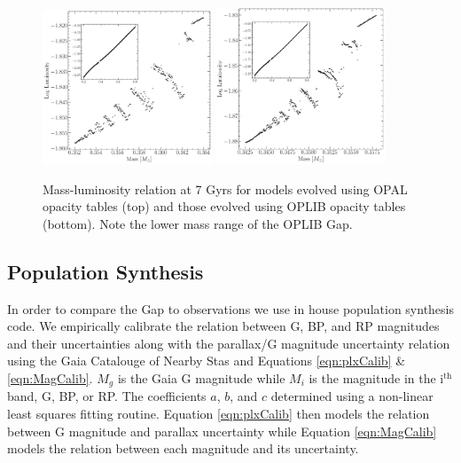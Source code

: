 \begin{figure}
	\centering
	\includegraphics[width=0.45\textwidth]{figures/jaoOpacity/OPALPunchIn.pdf}
	\includegraphics[width=0.45\textwidth]{figures/jaoOpacity/OPLIBPunchIn.pdf}
	\caption{Mass-luminosity relation at 7 Gyrs for models evolved using OPAL opacity
	tables (top) and those evolved using OPLIB opacity tables (bottom). Note
	the lower mass range of the OPLIB Gap.}
	\label{fig:PunchIn}
		
\end{figure}

\subsection{Population Synthesis}
In order to compare the Gap to observations we use in house population
synthesis code. We empirically calibrate the relation between G, BP, and RP
magnitudes and their uncertainties along with the parallax/G magnitude
uncertainty relation using the Gaia Catalouge of Nearby Stas
\citep[GCNS,][]{GaiaCollaboration2021} and Equations \ref{eqn:plxCalib} \&
\ref{eqn:MagCalib}. $M_{g}$ is the Gaia G magnitude while $M_{i}$ is the
magnitude in the i$^\text{th}$ band, G, BP, or RP. The coefficients $a$, $b$,
and $c$ determined using a non-linear least squares fitting routine. Equation
\ref{eqn:plxCalib} then models the relation between G magnitude and parallax
uncertainty while Equation \ref{eqn:MagCalib} models the relation between each
magnitude and its uncertainty.

